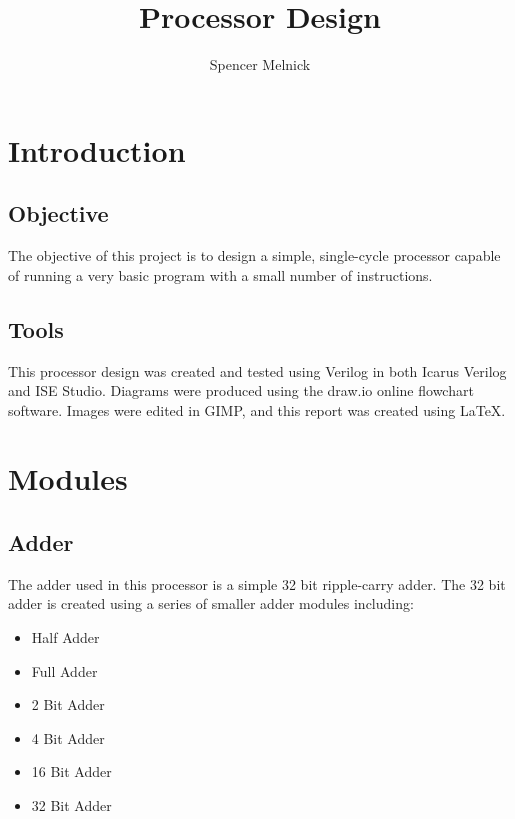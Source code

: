 \documentclass{article}
\begin{document}
    \title{Processor Design}
    \author{Spencer Melnick}

    \maketitle
    \tableofcontents
    \pagebreak

    \section{Introduction}

    \subsection{Objective}

    The objective of this project is to design a simple, single-cycle
    processor capable of running a very basic program with a small number
    of instructions.

    \subsection{Tools}

    This processor design was created and tested using Verilog in both Icarus
    Verilog and ISE Studio. Diagrams were produced using the draw.io online
    flowchart software. Images were edited in GIMP, and this report was
    created using LaTeX.

    \section{Modules}

    \subsection{Adder}

    The adder used in this processor is a simple 32 bit ripple-carry adder.
    The 32 bit adder is created using a series of smaller adder modules
    including:
    
    \begin{itemize}
        \item Half Adder
        \item Full Adder
        \item 2 Bit Adder
        \item 4 Bit Adder
        \item 16 Bit Adder
        \item 32 Bit Adder
    \end{itemize}
\end{document}
